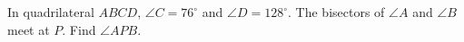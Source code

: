 In quadrilateral $ABCD$, $\angle C=76^\circ$ and $\angle D=128^\circ$. The bisectors of $\angle A$ and $\angle B$ meet at $P$. Find $\angle APB$.
